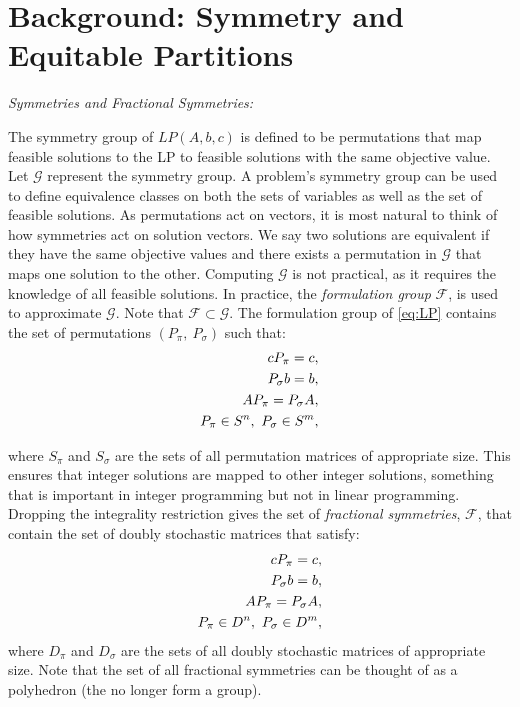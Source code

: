 \documentclass[runningheads]{llncs}
\newcommand{\cF}{{\mathcal F}}
\newcommand{\cG}{{\mathcal G}}
\begin{document}
\section{Background: Symmetry and Equitable Partitions}

{\em Symmetries and Fractional Symmetries:}

The symmetry group of $LP(A,b,c)$ is defined to
be permutations that map feasible solutions to the LP to feasible solutions with
the same objective value. Let $\cG$ represent the symmetry group. A problem's
symmetry group can be used to define equivalence classes on both the sets of
variables as well as the set of feasible solutions. As permutations act on
vectors, it is most natural to think of how symmetries act on solution vectors.
We say two solutions are equivalent if they have the same objective values and there exists a permutation in $\cG$ that
maps one solution to the other. Computing $\cG$ is not practical, as it requires the knowledge of all feasible solutions. In practice, the {\em formulation group} $\cF$, is used to approximate $\cG$. Note that $\cF \subset \cG$. The formulation group of \eqref{eq:LP} contains the set of
	permutations  $(P_\pi,\ P_\sigma)$ such that:
	\begin{align}  \label{eq:formulation}
	c  P_\pi = c, \\ \notag
	P_\sigma b =b,\\ \notag
	A  P_\pi = P_\sigma A, \\ \notag
	P_\pi \in S^n,\ P_\sigma \in S^m,
	\end{align}

\noindent where $S_\pi$ and $S_\sigma$ are the sets of all permutation matrices of appropriate size. This ensures that integer solutions are mapped to other integer solutions, something that is important in integer programming but not in linear programming. Dropping the integrality restriction gives the set of {\em fractional symmetries}, $\cF$, that contain the set of doubly stochastic matrices that satisfy:
	\begin{align}  \label{eq:fractional}
c  P_\pi = c, \\ \notag
P_\sigma b =b,\\ \notag
A  P_\pi = P_\sigma A, \\ \notag
P_\pi \in D^n,\ P_\sigma \in D^m,
\end{align}
where $D_\pi$ and $D_\sigma$ are the sets of all doubly stochastic matrices of appropriate size. Note that the set of all fractional symmetries can be thought of as a polyhedron (the no longer form a group). 
\end{document}
